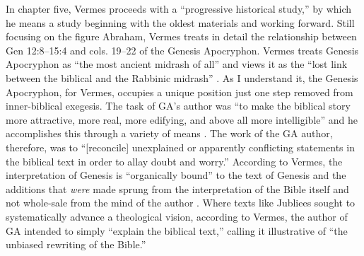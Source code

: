 In chapter five, Vermes proceeds with a ``progressive historical
study,'' by which he means a study beginning with the oldest materials
and working forward. Still focusing on the figure Abraham, Vermes treats
in detail the relationship between Gen 12:8--15:4 and cols. 19--22 of
the Genesis Apocryphon. Vermes treats Genesis Apocryphon as ``the most
ancient midrash of all''\autocite[124]{vermes1961} and views it as the
``lost link between the biblical and the Rabbinic midrash''
\autocite[124]{vermes1961}. As I understand it, the Genesis Apocryphon,
for Vermes, occupies a unique position just one step removed from
inner-biblical exegesis. The task of GA's author was ``to make the
biblical story more attractive, more real, more edifying, and above all
more intelligible'' and he accomplishes this through a variety of means
\autocite[125]{vermes1961}. The work of the GA author, therefore, was to
``{[}reconcile{]} unexplained or apparently conflicting statements in
the biblical text in order to allay doubt and
worry.''\autocite[125]{vermes1961} According to Vermes, the
interpretation of Genesis is ``organically bound'' to the text of
Genesis and the additions that \emph{were} made sprung from the
interpretation of the Bible itself and not whole-sale from the mind of
the author \autocite[126]{vermes1961}. Where texts like Jubliees sought
to systematically advance a theological vision, according to Vermes, the
author of GA intended to simply ``explain the biblical text,'' calling
it illustrative of ``the unbiased rewriting of the
Bible.''\autocite[126]{vermes1961}

